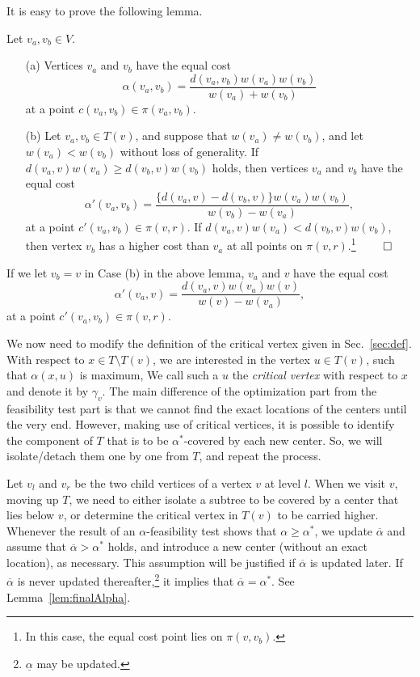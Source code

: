 \documentclass{llncs}
\newcommand{\QED}{\hfill$\qed$}
\begin{document}
{It is easy to prove the following lemma.
\begin{lemma}\label{lem:eqCost}
Let $v_a, v_b\in V$.
\begin{enumerate}
\item[(a)]
{\rm \cite{kariv1979b}}
Vertices $v_a$ and $v_b$ have the equal cost
\begin{equation}\label{eqn:equalcost1}
\alpha(v_a, v_b) 
= \frac{d(v_a, v_b)w(v_a)w(v_b)}{w(v_a)+w(v_b)}
\end{equation}
at a point $c(v_a, v_b)\in \pi(v_a, v_b)$.
\item[(b)]
Let $v_a, v_b \in T(v)$, and
suppose that $w(v_a)\not= w(v_b)$, and let $w(v_a)< w(v_b)$ without loss of generality.
If $d(v_a, v)w(v_a) \geq d(v_b, v)w(v_b)$ holds,
then vertices $v_a$ and $v_b$ have the equal cost
\begin{equation}
\alpha'(v_a, v_b) 
= \frac{\{d(v_a, v)- d(v_b, v)\}w(v_a)w(v_b)}{w(v_b)-w(v_a)}, \label{eqn:equalcost2}
\end{equation}
at a point $c'(v_a, v_b)\in \pi(v,r)$. 
If $d(v_a, v)w(v_a) < d(v_b, v)w(v_b)$,
then vertex $v_b$ has a higher cost than $v_a$ at all points on $\pi(v,r)$.\footnote{In this case,
the equal cost point lies on $\pi(v, v_b)$.}
\QED
\end{enumerate}
\end{lemma}

If we let $v_b=v$ in Case (b) in the above lemma,
$v_a$ and $v$ have the equal cost
\begin{equation}
\alpha'(v_a, v) 
= \frac{d(v_a, v)w(v_a)w(v)}{w(v)-w(v_a)}, \label{eqn:equalcost4}
\end{equation}
at a point $c'(v_a, v_b)\in \pi(v,r)$.

We now need to modify the definition of the critical vertex given in Sec.~\ref{sec:def}.
With respect to $x\in T\setminus T(v)$,
we are interested in the vertex $u\in T(v)$, 
such that $\alpha(x, u)$ is maximum,
We call such a $u$ the {\em critical vertex} with respect to $x$ and denote it by $\gamma_v$.
The main difference of the optimization part from the feasibility test part
is that we cannot find the exact locations of the centers until the very end.
However, making use of critical vertices, it is possible to identify
the component of $T$ that is to be $\alpha^*$-covered by each new center.
So, we will isolate/detach them one by one from $T$,
and repeat the process.

Let $v_l$ and $v_r$ be the two child vertices of a vertex $v$ at level $l$.
When we visit $v$, moving up $T$,
we need to either isolate a subtree to be covered by a center
that lies below $v$,
or determine the critical vertex in $T(v)$ to be carried higher.
Whenever the result of an $\alpha$-feasibility test shows that $\alpha\geq \alpha^*$,
we update $\overline{\alpha}$ and assume that $\overline{\alpha}> \alpha^*$ holds,
and introduce a new center (without an exact location),
as necessary.
This assumption will be justified if $\overline{\alpha}$ is updated later.
If $\overline{\alpha}$ is never updated thereafter,\footnote{$\underline{\alpha}$
may be updated.}
it implies that $\overline{\alpha}=\alpha^*$.
See Lemma~\ref{lem:finalAlpha}.

}
\end{document}

